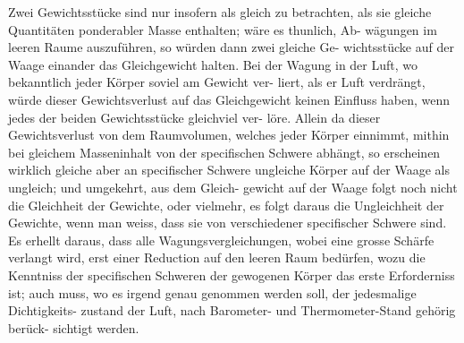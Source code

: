 \documentclass[12pt,a4paper]{article}
\theoremstyle{plain}
\theoremstyle{definition}
\theoremstyle{remark}
\begin{document}
\vspace{0.3cm}

Zwei Gewichtsst\"ucke sind nur insofern als gleich zu betrachten, als sie
gleiche Quantit\"aten ponderabler Masse enthalten; w\"are es thunlich, Ab-
w\"agungen im leeren Raume auszuf\"uhren, so w\"urden dann zwei gleiche Ge-
wichtsst\"ucke auf der Waage einander das Gleichgewicht halten. Bei der
Wagung in der Luft, wo bekanntlich jeder K\"orper soviel am Gewicht ver-
liert, als er Luft verdr\"angt, w\"urde dieser Gewichtsverlust auf das Gleichgewicht
keinen Einfluss haben, wenn jedes der beiden Gewichtsst\"ucke gleichviel ver-
l\"ore. Allein da dieser Gewichtsverlust von dem Raumvolumen, welches jeder
K\"orper einnimmt, mithin bei gleichem Masseninhalt von der specifischen
Schwere abh\"angt, so erscheinen wirklich gleiche aber an specifischer Schwere
ungleiche K\"orper auf der Waage als ungleich; und umgekehrt, aus dem Gleich-
gewicht auf der Waage folgt noch nicht die Gleichheit der Gewichte, oder
vielmehr, es folgt daraus die Ungleichheit der Gewichte, wenn man weiss,
dass sie von verschiedener specifischer Schwere sind. Es erhellt daraus, dass
alle Wagungsvergleichungen, wobei eine grosse Sch\"arfe verlangt wird, erst
einer Reduction auf den leeren Raum bed\"urfen, wozu die Kenntniss der
specifischen Schweren der gewogenen K\"orper das erste Erforderniss ist; auch
muss, wo es irgend genau genommen werden soll, der jedesmalige Dichtigkeits-
zustand der Luft, nach Barometer- und Thermometer-Stand geh\"orig ber\"uck-
sichtigt werden.
\end{document}
